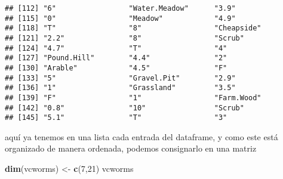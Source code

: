 \documentclass[]{article}
\newenvironment{Shaded}{\begin{snugshade}}{\end{snugshade}}
\newcommand{\KeywordTok}[1]{\textcolor[rgb]{0.13,0.29,0.53}{\textbf{#1}}}
\newcommand{\DecValTok}[1]{\textcolor[rgb]{0.00,0.00,0.81}{#1}}
\newcommand{\StringTok}[1]{\textcolor[rgb]{0.31,0.60,0.02}{#1}}
\newcommand{\NormalTok}[1]{#1}
\begin{document}
\begin{verbatim}
## [112] "6"                 "Water.Meadow"      "3.9"              
## [115] "0"                 "Meadow"            "4.9"              
## [118] "T"                 "8"                 "Cheapside"        
## [121] "2.2"               "8"                 "Scrub"            
## [124] "4.7"               "T"                 "4"                
## [127] "Pound.Hill"        "4.4"               "2"                
## [130] "Arable"            "4.5"               "F"                
## [133] "5"                 "Gravel.Pit"        "2.9"              
## [136] "1"                 "Grassland"         "3.5"              
## [139] "F"                 "1"                 "Farm.Wood"        
## [142] "0.8"               "10"                "Scrub"            
## [145] "5.1"               "T"                 "3"
\end{verbatim}

aquí ya tenemos en una lista cada entrada del dataframe, y como este
está organizado de manera ordenada, podemos consignarlo en una matriz

\begin{Shaded}
\begin{Highlighting}[]
\KeywordTok{dim}\NormalTok{(vcworms) <-}\StringTok{ }\KeywordTok{c}\NormalTok{(}\DecValTok{7}\NormalTok{,}\DecValTok{21}\NormalTok{) }
\NormalTok{vcworms}
\end{Highlighting}
\end{Shaded}
\end{document}
